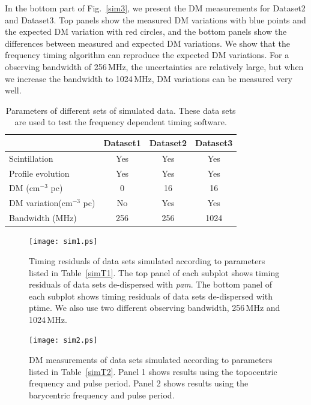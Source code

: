 \documentclass[useAMS,usenatbib]{mn2e}
\begin{document}
In the bottom part of Fig.~\ref{sim3}, we present the DM measurements for Dataset2 and Dataset3. 
Top panels show the measured DM variations with blue points and the expected DM variation 
with red circles, and the bottom panels show the differences between measured and expected
DM variations.
%
We show that the frequency timing algorithm can reproduce the expected DM variations. For a 
observing bandwidth of 256\,MHz, the uncertainties are relatively large, but when we increase 
the bandwidth to 1024\,MHz, DM variations can be measured very well.



\begin{table}
\begin{center}
\caption{Parameters of different sets of simulated data. These data sets are used to
test the frequency dependent timing software.}
\label{simT3}
\begin{tabular}{lccc}
\hline
                           &    Dataset1   &   Dataset2    &   Dataset3   \\
\hline                                                                    
Scintillation              &     Yes       &   Yes         &    Yes       \\
Profile evolution          &     Yes       &   Yes         &    Yes       \\
DM (cm$^{-3}$ pc)          &     0         &   16          &    16        \\
DM variation(cm$^{-3}$ pc) &     No        &   Yes         &    Yes       \\
Bandwidth (MHz)            &     256       &   256         &    1024      \\
\hline
\end{tabular}
\end{center}
\end{table}

\begin{figure}
\center
\texttt{[image: sim1.ps]}
\caption{Timing residuals of data sets simulated according to parameters listed in Table~\ref{simT1}. 
The top panel of each subplot shows timing residuals of data sets de-dispersed with \textit{pam}.
The bottom panel of each subplot shows timing residuals of data sets de-dispersed with ptime.
We also use two different observing bandwidth, 256\,MHz and 1024\,MHz.}
\label{sim1}
\end{figure}

\begin{figure}
\center
\texttt{[image: sim2.ps]}
\caption{DM measurements of data sets simulated according to parameters listed in Table~\ref{simT2}. 
Panel 1 shows results using the topocentric frequency and pulse period.
Panel 2 shows results using the barycentric frequency and pulse period.}
\label{sim2}
\end{figure}
\end{document}

